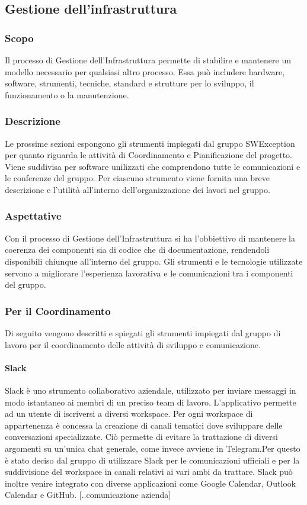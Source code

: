 \subsection{Gestione dell'infrastruttura}
\subsubsection{Scopo}
Il processo di Gestione dell’Infrastruttura permette di stabilire e mantenere un modello necessario per qualsiasi altro processo. Essa può includere hardware, software, strumenti, tecniche, standard e strutture per lo sviluppo, il funzionamento o la
manutenzione.

\subsubsection{Descrizione}
Le prossime sezioni espongono gli strumenti impiegati dal gruppo SWException per quanto riguarda le attività di Coordinamento e Pianificazione del progetto. Viene suddivisa per software unilizzati che comprendono tutte le comunicazioni e le conferenze del gruppo. Per ciascuno strumento viene fornita una breve descrizione e l'utilità all'interno dell'organizzazione dei lavori nel gruppo.

\subsubsection{Aspettative}
Con il processo di Gestione dell’Infrastruttura si ha l'obbiettivo di mantenere la coerenza dei componenti sia di codice che di documentazione, rendendoli disponibili chiunque all'interno del gruppo. Gli strumenti e le tecnologie utilizzate servono a migliorare l'esperienza lavorativa e le comunicazioni tra i componenti del gruppo. 


\subsubsection{Per il Coordinamento}
Di seguito vengono descritti e spiegati gli strumenti impiegati dal gruppo di lavoro per il coordinamento delle attività di sviluppo e comunicazione.

\paragraph{Slack}
Slack è uno strumento collaborativo aziendale, utilizzato per inviare messaggi in modo istantaneo ai membri di un preciso team di lavoro. L’applicativo permette ad un utente di iscriversi
a diversi workspace. Per ogni workspace di appartenenza è concessa la creazione di canali
tematici dove sviluppare delle conversazioni specializzate. Ciò permette di evitare la trattazione di diversi argomenti su un’unica chat generale, come invece avviene in Telegram.Per questo è stato deciso dal gruppo di utilizzare Slack per le comunicazioni ufficiali e per la suddivisione del workspace in canali relativi ai vari ambi da trattare. Slack può inoltre venire integrato con diverse applicazioni come Google Calendar, Outlook Calendar e GitHub.
[..comunicazione azienda]

